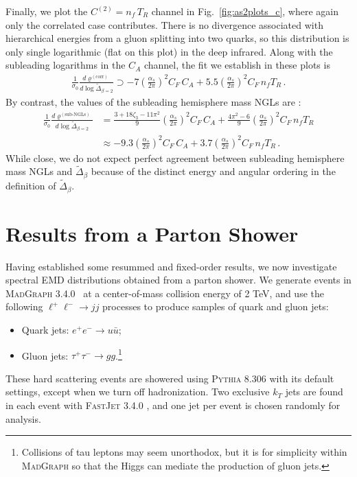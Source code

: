 \documentclass[letterpaper,11pt]{article}
\DeclareRobustCommand{\Fig}[1]{Fig.~\ref{#1}}
\begin{document}
Finally, we plot the $C^{(2)}=n_f \, T_R$ channel in \Fig{fig:as2plots_c}, where again only the correlated case contributes.   
%
There is no divergence associated with hierarchical energies from a gluon splitting into two quarks, so this distribution is only single logarithmic (flat on this plot) in the deep infrared.  
%
Along with the subleading logarithms in the $C_A$ channel, the fit we establish in these plots is
%
\begin{align}
\frac{1}{\sigma_0}\frac{d\varrho^{(\text{corr})}}{d\log\tilde\Delta_{\beta = 2}}\supset -7\left(\frac{\alpha_s}{2\pi}\right)^2C_F \, C_A+5.5\left(\frac{\alpha_s}{2\pi}\right)^2C_F \, n_f T_R\,.
\end{align}
%
By contrast, the values of the subleading hemisphere mass NGLs are \cite{Kelley:2011ng,Hornig:2011iu}:
%
\begin{align}
\frac{1}{\sigma_0}\frac{d\varrho^{(\text{sub-NGLs})}}{d\log\tilde\Delta_{\beta = 2}}&= \frac{3+18\zeta_3-11\pi^2}{9}\left(\frac{\alpha_s}{2\pi}\right)^2C_F \, C_A+\frac{4\pi^2-6}{9}\left(\frac{\alpha_s}{2\pi}\right)^2C_F \, n_f T_R\\
&\approx -9.3\left(\frac{\alpha_s}{2\pi}\right)^2 C_F \, C_A+3.7\left(\frac{\alpha_s}{2\pi}\right)^2C_F \, n_f T_R
\,.\nonumber
\end{align}
%
While close, we do not expect perfect agreement between subleading hemisphere mass NGLs and $\tilde \Delta_\beta$ because of the distinct energy and angular ordering in the definition of $\tilde \Delta_\beta$.



\section{Results from a Parton Shower}
\label{sec:qgparton}

Having established some resummed and fixed-order results, we now investigate spectral EMD distributions obtained from a parton shower.
%
We generate events in \textsc{MadGraph 3.4.0}~\cite{Alwall:2014hca} at a center-of-mass collision energy of 2 TeV, and use the following $\ell^+\ell^-\to jj$ processes to produce samples of quark and gluon jets:
%
\begin{itemize}
\item Quark jets: $e^+e^-\to u\bar u$;
\item Gluon jets: $\tau^+\tau^-\to gg$.\footnote{Collisions of tau leptons may seem unorthodox, but it is for simplicity within \textsc{MadGraph} so that the Higgs can mediate the production of gluon jets.}
\end{itemize}
%
These hard scattering events are showered using \textsc{Pythia 8.306} \cite{Bierlich:2022pfr} with its default settings, except when we turn off hadronization.  
%
Two exclusive $k_T$ jets \cite{Catani:1991hj} are found in each event with \textsc{FastJet 3.4.0} \cite{Cacciari:2011ma}, and one jet per event is chosen randomly for analysis.  
\end{document}
